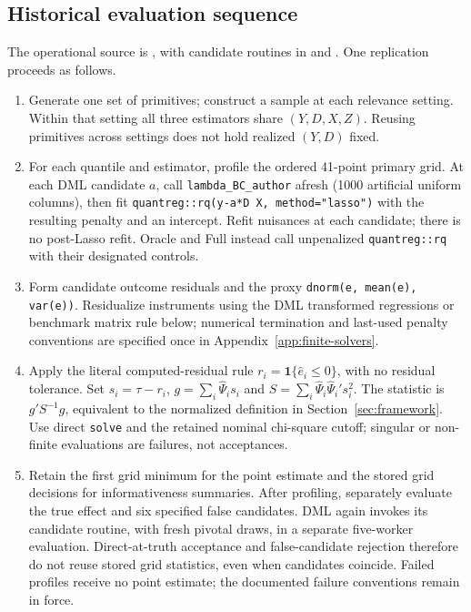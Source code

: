 \subsection{Historical evaluation sequence}
\label{app:evaluation-sequence}
The operational source is , with candidate routines in  and . One replication proceeds as follows.
\begin{enumerate}
\item Generate one set of primitives; construct a sample at each relevance setting. Within that setting all three estimators share $(Y,D,X,Z)$. Reusing primitives across settings does not hold realized $(Y,D)$ fixed.
\item For each quantile and estimator, profile the ordered 41-point primary grid. At each DML candidate $a$, call \texttt{lambda\_BC\_author} afresh (1000 artificial uniform columns), then fit \texttt{quantreg::rq(y-a*D\string~X, method="lasso")} with the resulting penalty and an intercept. Refit nuisances at each candidate; there is no post-Lasso refit. Oracle and Full instead call unpenalized \texttt{quantreg::rq} with their designated controls.
\item Form candidate outcome residuals and the proxy \texttt{dnorm(e, mean(e), var(e))}. Residualize instruments using the DML transformed regressions or benchmark matrix rule below; numerical termination and last-used penalty conventions are specified once in Appendix~\ref{app:finite-solvers}.
\item Apply the literal computed-residual rule $r_i=\mathbf1\{\widehat e_i\leq0\}$, with no residual tolerance. Set $s_i=\tau-r_i$, $g=\sum_i\widehat\Psi_i s_i$ and $S=\sum_i\widehat\Psi_i\widehat\Psi_i' s_i^2$. The statistic is $g'S^{-1}g$, equivalent to the normalized definition in Section~\ref{sec:framework}. Use direct \texttt{solve} and the retained nominal chi-square cutoff; singular or non-finite evaluations are failures, not acceptances.
\item Retain the first grid minimum for the point estimate and the stored grid decisions for informativeness summaries. After profiling, separately evaluate the true effect and six specified false candidates. DML again invokes its candidate routine, with fresh pivotal draws, in a separate five-worker evaluation. Direct-at-truth acceptance and false-candidate rejection therefore do not reuse stored grid statistics, even when candidates coincide. Failed profiles receive no point estimate; the documented failure conventions remain in force.
\end{enumerate}
